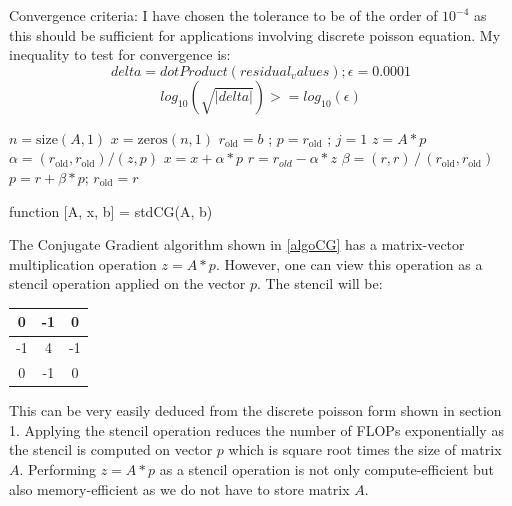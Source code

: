 \documentclass{article}
\begin{document}
\begin{spacing}{1.1}
Convergence criteria: I have chosen the tolerance to be of the order of $10^{-4}$ as this should be sufficient for applications involving discrete poisson equation. My inequality to test for convergence is:
\[ delta = dotProduct(residual_values); \epsilon = 0.0001 \]
\[ log_{10}(\sqrt{|delta|}) >= log_{10}(\epsilon) \]


\begin{algorithm}[H]

\begin{algorithmic}[1]

\STATE $n = \text{size}(A,1)$ 
\STATE $x = \text{zeros}(n,1)$
\STATE $r_{\text{old}} = b$ ; $p = r_{\text{old}}$ ; $j = 1$
\STATE $z = A*p$ 
\STATE ${\alpha} = (r_{\text{old}}, r_{\text{old}})/(z, p)$
\STATE $x = x + \alpha * p$ 
\STATE $r = r_{old} - \alpha * z$
\STATE $\beta = (r, r) \, / \, (r_{\text{old}}, r_{\text{old}})$
\STATE $p = r + \beta* p$;
\STATE $r_{\text{old}} = r$
\ENDFOR
\end{algorithmic}
\caption{\label{algoCG} function [A, x, b] = stdCG(A, b)} 
\end{algorithm}

The Conjugate Gradient algorithm shown in \eqref{algoCG} has a matrix-vector multiplication operation $z=A*p$. However, one can view this operation as a stencil operation applied on the vector $p$. The stencil will be:
\begin{tabular}{|c|c|c|}
\hline
0 & -1 & 0\\ \hline
-1 & 4 & -1 \\ \hline
0 & -1 & 0 \\ \hline
\end{tabular}

This can be very easily deduced from the discrete poisson form shown in section 1.
Applying the stencil operation reduces the number of FLOPs exponentially as the stencil is computed on vector $p$ which is square root times the size of matrix $A$.
Performing $z=A*p$ as a stencil operation is not only compute-efficient but also memory-efficient as we do not have to store matrix $A$.


\end{spacing}
\end{document}
